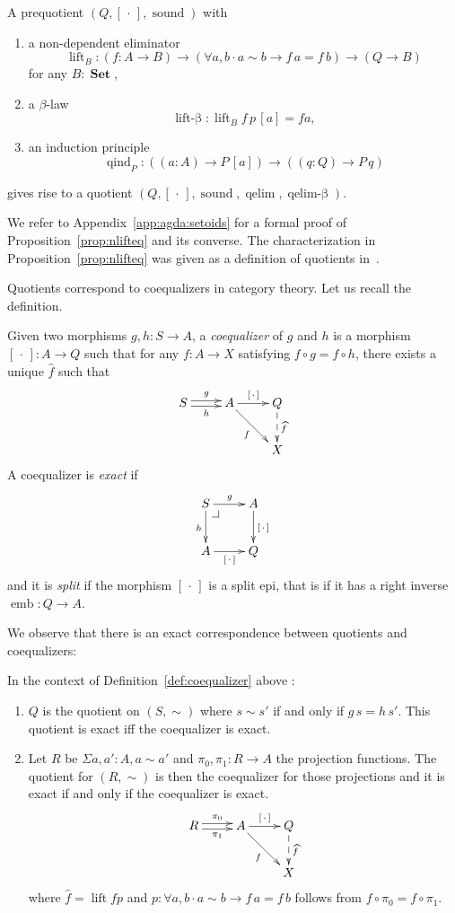 \documentclass[envcountsame]{llncs}
\makeatletter
\newcommand{\dotph}{\,\cdot\,} %
\providecommand{\class}[1]{[#1]}
\providecommand{\dlift}[1]{\widehat{#1}}
\DeclareMathOperator{\Set}{\mathbf{Set}}
\DeclareMathOperator{\sound}{sound}
\DeclareMathOperator{\qelimbeta}{qelim-\beta}
\DeclareMathOperator{\qind}{qind}
\DeclareMathOperator{\emb}{emb}
\DeclareMathOperator{\qelim}{qelim}
\DeclareMathOperator{\lift}{lift}
\DeclareMathOperator{\liftbeta}{lift-\beta}
\renewcommand{\equiv}{=}
\newcommand{\pullbackcorner}[1][dr]{\save*!/#1-1.2pc/#1:(-1,1)@^{|-}\restore}
\makeatother
\begin{document}
\begin{proposition}\label{prop:nlifteq}
A prequotient $(Q,\class\dotph,\sound)$ with

\begin{enumerate}
\item a non-dependent eliminator $$\lift_B\colon (f\colon A \to B) \to (\forall a,b\cdot a\sim b \to f\,a \equiv f\,b) \to (Q \to B)$$ for any $B\colon\Set$,
\item a $\beta$-law $$\liftbeta : \lift_B f \,p\,\class a\equiv f a,$$
\item an induction principle $$\qind_P\colon ((a\colon A)\to P \,\class a)\to ((q\colon Q)\to P\,q)$$
\end{enumerate}
gives rise to a quotient $(Q,\class\dotph,\sound,\qelim,\qelimbeta)$.
\end{proposition}
We refer to Appendix~\ref{app:agda:setoids} for a formal proof of Proposition~\ref{prop:nlifteq} and its converse. The characterization in Proposition~\ref{prop:nlifteq} was given as a definition of quotients in~\cite{hofmann1995thesis}.

\bigskip

Quotients correspond to coequalizers in category theory. Let us recall the definition.
\begin{definition}\label{def:coequalizer}
Given two morphisms $g,h : S\to A$, a \emph{coequalizer} of $g$ and $h$ is a morphism $\class\dotph:A\to Q$ such that for any $f:A\to X$ satisfying $f \circ g = f \circ h$, there exists a unique $\dlift f$ such that
\[\xymatrix{
S\ar@<0.5ex>[r]^g\ar@<-0.5ex>[r]_h& A\ar[r]^{\class\dotph}\ar[dr]_{f} & Q\ar@{-->}[d]^{\dlift f}\\
&&X
}\]
A coequalizer is \emph{exact} if
\[\xymatrix{
S\pullbackcorner\ar[r]^g\ar[d]_h & A\ar[d]^{\class\dotph} \\
A\ar[r]_{\class\dotph} & Q
}\]
and it is \emph{split} if the morphism $\class\dotph$ is a split epi, that is if it has a right inverse $\emb : Q \to A$.
\end{definition}

We observe that there is an exact correspondence between quotients and coequalizers:
\begin{proposition} In the context of Definition~\ref{def:coequalizer} above :
\begin{enumerate}
\item $Q$ is the quotient on $(S,\sim)$ where $s\sim s'$ if and only if $g\,s=h\,s'$.
This quotient is exact if{f} the coequalizer is exact.
\item Let $R$ be $\Sigma a,a':A,a\sim a'$ and $\pi_0,\pi_1 : R\to A$ the projection functions. The quotient for $(R,\sim)$ is then the coequalizer for those projections and it is exact if and only if the coequalizer is exact.
\[\xymatrix{
R\ar@<0.5ex>[r]^{\pi_0}\ar@<-0.5ex>[r]_{\pi_1}& A\ar[r]^{\class\dotph}\ar[dr]_{f} & Q\ar@{-->}[d]^{\dlift f}\\
&&X
}\]
where $\dlift f=\lift f p$ and $p \colon \forall a,b\cdot a\sim b \to f\,a \equiv f\,b$ follows from $f \circ \pi_0 = f \circ \pi_1$.
\end{enumerate}
\end{proposition}
\end{document}
